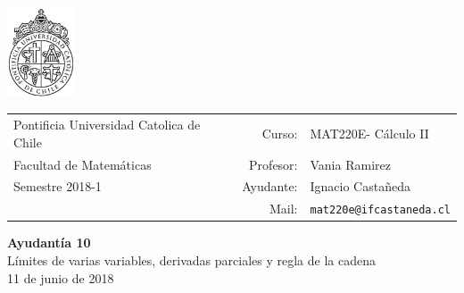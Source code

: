 \documentclass[12pt]{article}
\makeatletter
\newcommand{\ayudantia}{{\sc Ayudantía 10}}
\newcommand{\tituloayu}{Límites de varias variables, derivadas parciales y regla de la cadena}
\newcommand{\fecha}{11 de junio de 2018}
\newcommand{\sigla}{MAT220E}
\newcommand{\nombre}{Cálculo II}
\newcommand{\profesor}{Vania Ramirez}
\newcommand{\ano}{2018}
\newcommand{\semestre}{1}
\newcommand{\mail}{mat220e@ifcastaneda.cl}
\makeatother
\begin{document}
\thispagestyle{empty}

\begin{minipage}{2cm}
	\includegraphics[width=2cm]{../../../../img/logo.pdf}
	\vspace{0.5cm}
\end{minipage}
\begin{minipage}{\linewidth}
	\begin{tabular}{lrl}
		{\scriptsize\sc Pontificia Universidad Catolica de Chile} & \hspace*{0.7in}Curso: &
		\sigla  - \nombre\\
		{\sc Facultad de Matemáticas}&
		Profesor: & \profesor \\
		{\sc Semestre \ano-\semestre} & Ayudante: & {Ignacio Castañeda}\\
		& {Mail:} & \texttt{\mail}
	\end{tabular}
\end{minipage}

\vspace{-10mm}
\begin{center}
	{\LARGE\bf \ayudantia}\\
	\vspace{0.1cm}
	{\tituloayu}\\
	\vspace{0.1cm}
	\fecha\\
	\vspace{0.4cm}
\end{center}
\end{document}
